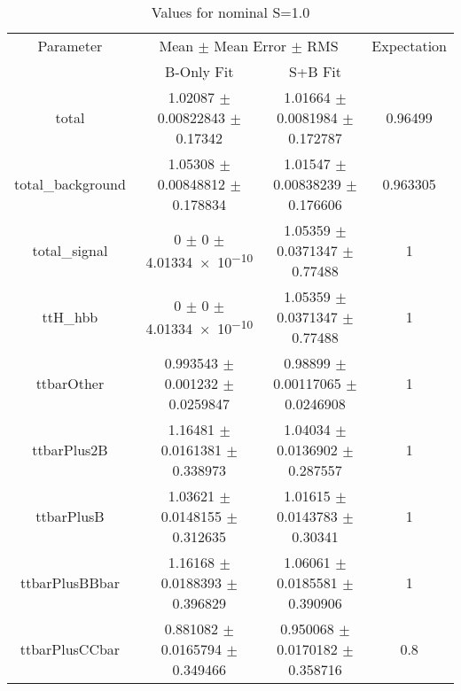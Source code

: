 \begin{table}
\centering
\caption{Values for nominal S=1.0}
\begin{tabular}{cccc}
\toprule
Parameter & \multicolumn{2}{c}{Mean $\pm$ Mean Error $\pm$ RMS} & Expectation\\
 & B-Only Fit & S+B Fit & \\
\midrule
total & \num{1.02087} $\pm$ \num{0.00822843} $\pm$ \num{0.17342} & \num{1.01664} $\pm$ \num{0.0081984} $\pm$ \num{0.172787} & \num{0.96499}\\
total\_background & \num{1.05308} $\pm$ \num{0.00848812} $\pm$ \num{0.178834} & \num{1.01547} $\pm$ \num{0.00838239} $\pm$ \num{0.176606} & \num{0.963305}\\
total\_signal & \num{0} $\pm$ \num{0} $\pm$ \num{4.01334e-10} & \num{1.05359} $\pm$ \num{0.0371347} $\pm$ \num{0.77488} & \num{1}\\
ttH\_hbb & \num{0} $\pm$ \num{0} $\pm$ \num{4.01334e-10} & \num{1.05359} $\pm$ \num{0.0371347} $\pm$ \num{0.77488} & \num{1}\\
ttbarOther & \num{0.993543} $\pm$ \num{0.001232} $\pm$ \num{0.0259847} & \num{0.98899} $\pm$ \num{0.00117065} $\pm$ \num{0.0246908} & \num{1}\\
ttbarPlus2B & \num{1.16481} $\pm$ \num{0.0161381} $\pm$ \num{0.338973} & \num{1.04034} $\pm$ \num{0.0136902} $\pm$ \num{0.287557} & \num{1}\\
ttbarPlusB & \num{1.03621} $\pm$ \num{0.0148155} $\pm$ \num{0.312635} & \num{1.01615} $\pm$ \num{0.0143783} $\pm$ \num{0.30341} & \num{1}\\
ttbarPlusBBbar & \num{1.16168} $\pm$ \num{0.0188393} $\pm$ \num{0.396829} & \num{1.06061} $\pm$ \num{0.0185581} $\pm$ \num{0.390906} & \num{1}\\
ttbarPlusCCbar & \num{0.881082} $\pm$ \num{0.0165794} $\pm$ \num{0.349466} & \num{0.950068} $\pm$ \num{0.0170182} $\pm$ \num{0.358716} & \num{0.8}\\
\bottomrule
\end{tabular}
\end{table}